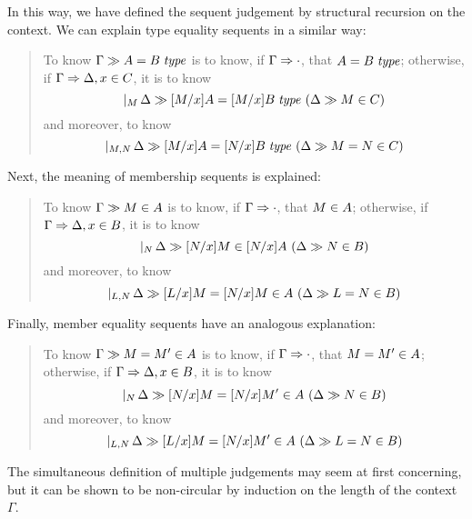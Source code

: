 \documentclass[main.tex]{subfiles}
\begin{document}
In this way, we have defined the sequent judgement by structural
recursion on the context. We can explain type equality sequents in a
similar way:

\begin{quote}
  To know $\Gamma\gg A=B\;\mathit{type}$ is to know, if $\Gamma\Rightarrow\cdot$, that $A=B\;\mathit{type}$; otherwise, if $\Gamma\Rightarrow\Delta,x\in C$, it is to know
  \[
    \genj{M}{
      \hyp{
        \sequent{\Delta}{
          \isset{
            [M/x]A=[M/x]B
          }
        }
      }{
        \sequent{\Delta}{
          \ver{M}{C}
        }
      }
    }
  \]
  and moreover, to know
  \[
    \genj{M,N}{
      \hyp{
        \sequent{\Delta}{
          \isset{[M/x]A=[N/x]B}
        }
      }{
        \sequent{\Delta}{
          \ver{M=N}{C}
        }
      }
    }
  \]
\end{quote}

Next, the meaning of membership sequents is explained:

\begin{quote}
  To know $\Gamma\gg M\in A$ is to know, if
  $\Gamma\Rightarrow\cdot$, that $M\in A$; otherwise, if
  $\Gamma\Rightarrow\Delta,x\in B$, it is to know
  \[
    \genj{N}{
      \hyp{
        \sequent{\Delta}{
          \ver{[N/x]M}{[N/x]A}
        }
      }{
        \sequent{\Delta}{
          \ver{N}{B}
        }
      }
    }
  \]
  and moreover, to know
  \[
    \genj{L,N}{
      \hyp{
        \sequent{\Delta}{
          \ver{[L/x]M=[N/x]M}{A}
        }
      }{
        \sequent{\Delta}{
          \ver{L=N}{B}
        }
      }
    }
  \]
\end{quote}

Finally, member equality sequents have an analogous explanation:

\begin{quote}
  To know $\Gamma\gg M=M'\in A$ is to know, if
  $\Gamma\Rightarrow\cdot$, that $M=M'\in A$; otherwise, if
  $\Gamma\Rightarrow\Delta,x\in B$, it is to know
  \[
    \genj{N}{
      \hyp{
        \sequent{\Delta}{
          \ver{[N/x]M=[N/x]M'}{A}
        }
      }{
        \sequent{\Delta}{
          \ver{N}{B}
        }
      }
    }
  \]
  and moreover, to know
  \[
    \genj{L,N}{
      \hyp{
        \sequent{\Delta}{
          \ver{[L/x]M=[N/x]M'}{A}
        }
      }{
        \sequent{\Delta}{
          \ver{L=N}{B}
        }
      }
    }
  \]
\end{quote}

The simultaneous definition of multiple judgements may seem at first
concerning, but it can be shown to be non-circular by induction on the length
of the context $\Gamma$.
\end{document}
